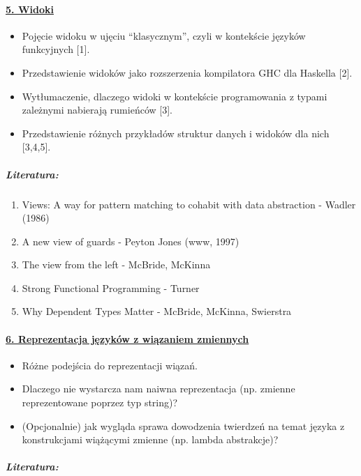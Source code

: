 \documentclass[10pt, a4paper]{article}
\begin{document}
\paragraph{\underline{5. Widoki}}

\begin{itemize}
\addtolength{\itemsep}{-0.5\baselineskip}
 \item Pojęcie widoku w ujęciu “klasycznym”, czyli w kontekście języków funkcyjnych [1].
 \item Przedstawienie widoków jako rozszerzenia kompilatora GHC dla Haskella [2].
 \item Wytłumaczenie, dlaczego widoki w kontekście programowania z typami zależnymi nabierają rumieńców [3].
 \item Przedstawienie różnych przykładów struktur danych i widoków dla nich [3,4,5].
\end{itemize}

\subparagraph{Literatura:}

\begin{enumerate}
\addtolength{\itemsep}{-0.5\baselineskip}
 \item Views: A way for pattern matching to cohabit with data abstraction - Wadler (1986)
 \item A new view of guards - Peyton Jones (www, 1997)
 \item The view from the left - McBride, McKinna
 \item Strong Functional Programming - Turner
 \item Why Dependent Types Matter - McBride, McKinna, Swierstra
\end{enumerate}

\paragraph{\underline{6. Reprezentacja języków z wiązaniem zmiennych}}

\begin{itemize}
\addtolength{\itemsep}{-0.5\baselineskip}
 \item Różne podejścia do reprezentacji wiązań. 
 \item Dlaczego nie wystarcza nam naiwna reprezentacja (np. zmienne reprezentowane poprzez typ string)? 
 \item (Opcjonalnie) jak wygląda sprawa dowodzenia twierdzeń na temat języka z konstrukcjami wiążącymi zmienne (np. lambda abstrakcje)?
\end{itemize}

\subparagraph{Literatura:}
\end{document}
